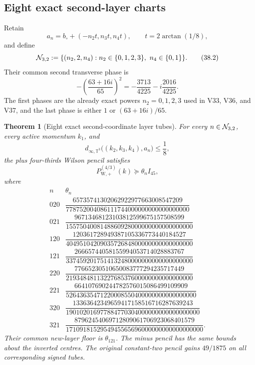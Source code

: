 \documentclass[11pt,oneside]{article}
\newtheorem{theorem}{Theorem}[section]
\theoremstyle{definition}
\theoremstyle{remark}
\begin{document}
\subsection{Eight exact second-layer charts}

Retain
\[
 a_n=b_\circ+(-n_2t,n_3t,n_4t),\qquad
 t=2\arctan(1/8),                                     \tag{38.1}
\]
and define
\[
 {\cal N}_{3,2}:=
 \{(n_2,2,n_4):n_2\in\{0,1,2,3\},\
                   n_4\in\{0,1\}\}.                  \tag{38.2}
\]
Their common second transverse phase is
\[
 -\left(\frac{63+16i}{65}\right)^2
 =-\frac{3713}{4225}-i\frac{2016}{4225}.              \tag{38.3}
\]
The first phases are the already exact powers \(n_2=0,1,2,3\)
used in V33, V36, and V37, and the last phase is either \(1\) or
\((63+16i)/65\).

\begin{theorem}[Eight exact second-coordinate layer tubes]
\label{thm:newv38-eight-charts}
For every \(n\in{\cal N}_{3,2}\), every active momentum \(k_1\), and
\[
 d_{\infty,\mathbb T^3}
 \bigl((k_2,k_3,k_4),a_n\bigr)\le\frac18,              \tag{38.4}
\]
the plus four-thirds Wilson pencil satisfies
\[
 P_{\mathrm W,+}^{(4/3)}(k)\succeq\theta_nI_{45},     \tag{38.5}
\]
where
\[
\begin{array}{c|c}
n&\theta_n\\ \hline
020&
\dfrac{65735741302062922977663008547209}
{778752004086111744000000000000000000}\\[6pt]
021&
\dfrac{96713468123103812599675157508599}
{1557504008148860928000000000000000000}\\[6pt]
120&
\dfrac{120361728949387105336773440184527}
{4049510420903572684800000000000000000}\\[6pt]
121&
\dfrac{26665744058155994053714028883767}
{3374592017514132480000000000000000000}\\[6pt]
220&
\dfrac{77665230510650083777294235717449}
{2193484811322768537600000000000000000}\\[6pt]
221&
\dfrac{664107690244782576015086499109909}
{52643635471220008550400000000000000000}\\[6pt]
320&
\dfrac{13363642349659417158516716287639243}
{190102016977884770304000000000000000000}\\[6pt]
321&
\dfrac{87962454069712809061706923068401579}
{1710918152954945565696000000000000000000}.
\end{array}                                            \tag{38.6}
\]
Their common new-layer floor is \(\theta_{121}\).  The minus pencil
has the same bounds about the inverted centres.  The original
constant-two pencil gains \(49/1875\) on all corresponding signed
tubes.
\end{theorem}
\end{document}
